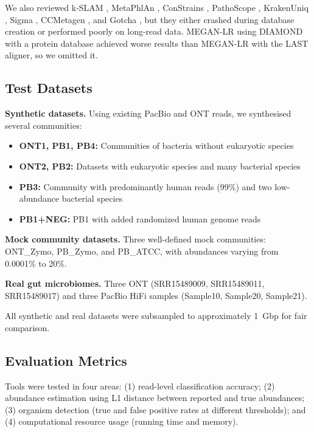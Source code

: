 \documentclass{article}
\begin{document}
We also reviewed k-SLAM \citep{ainsworth2017kslam}, MetaPhlAn \citep{truong2015metaphlan2}, ConStrains \citep{luo2015constrains}, PathoScope \citep{hong2014pathoscope}, KrakenUniq \citep{breitwieser2018krakenuniq}, Sigma \citep{ahn2015sigma}, CCMetagen \citep{marcelino2020ccmetagen}, and Gotcha \citep{martin2004gotcha}, but they either crashed during database creation or performed poorly on long-read data. MEGAN-LR using DIAMOND \citep{buchfink2014fast} with a protein database achieved worse results than MEGAN-LR with the LAST aligner, so we omitted it.

\subsection{Test Datasets}

\textbf{Synthetic datasets.} Using existing PacBio and ONT reads, we synthesised several communities:
\begin{itemize}
    \item \textbf{ONT1, PB1, PB4:} Communities of bacteria without eukaryotic species
    \item \textbf{ONT2, PB2:} Datasets with eukaryotic species and many bacterial species
    \item \textbf{PB3:} Community with predominantly human reads (99\%) and two low-abundance bacterial species
    \item \textbf{PB1+NEG:} PB1 with added randomized human genome reads
\end{itemize}

\textbf{Mock community datasets.} Three well-defined mock communities: ONT\_Zymo, PB\_Zymo, and PB\_ATCC, with abundances varying from 0.0001\% to 20\%.

\textbf{Real gut microbiomes.} Three ONT (SRR15489009, SRR15489011, SRR15489017) and three PacBio HiFi samples (Sample10, Sample20, Sample21).

All synthetic and real datasets were subsampled to approximately 1~Gbp for fair comparison.

\subsection{Evaluation Metrics}

Tools were tested in four areas: (1) read-level classification accuracy; (2) abundance estimation using L1 distance between reported and true abundances; (3) organism detection (true and false positive rates at different thresholds); and (4) computational resource usage (running time and memory).
\end{document}
